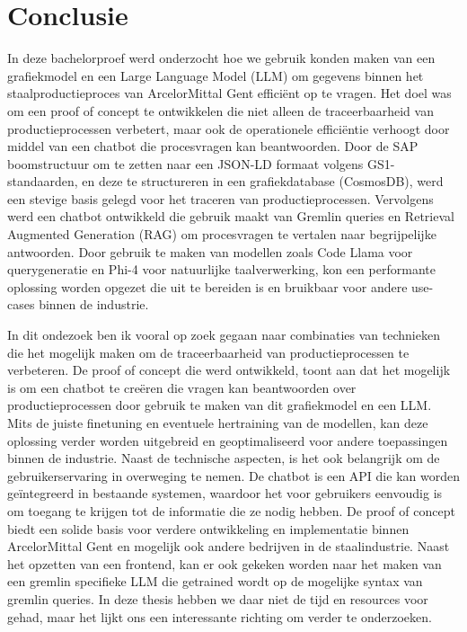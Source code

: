 
\chapter{Conclusie}%
\label{ch:conclusie}
In deze bachelorproef werd onderzocht hoe we gebruik konden maken van een grafiekmodel en een Large Language Model (LLM) om gegevens binnen het staalproductieproces van ArcelorMittal Gent efficiënt op te vragen. 
Het doel was om een proof of concept te ontwikkelen die niet alleen de traceerbaarheid van productieprocessen verbetert, maar ook de operationele efficiëntie verhoogt door middel van een chatbot die procesvragen kan beantwoorden.
Door de SAP boomstructuur om te zetten naar een JSON-LD formaat volgens GS1-standaarden, en deze te structureren in een grafiekdatabase (CosmosDB), werd een stevige basis gelegd voor het traceren van productieprocessen.
Vervolgens werd een chatbot ontwikkeld die gebruik maakt van Gremlin queries en Retrieval Augmented Generation (RAG) om procesvragen te vertalen naar begrijpelijke antwoorden.
Door gebruik te maken van modellen zoals Code Llama voor querygeneratie en Phi-4 voor natuurlijke taalverwerking, kon een performante oplossing worden opgezet die uit te bereiden is en bruikbaar voor andere use-cases binnen de industrie.

In dit ondezoek ben ik vooral op zoek gegaan naar combinaties van technieken die het mogelijk maken om de traceerbaarheid van productieprocessen te verbeteren.
De proof of concept die werd ontwikkeld, toont aan dat het mogelijk is om een chatbot te creëren die vragen kan beantwoorden over productieprocessen door gebruik te maken van dit grafiekmodel en een LLM.
Mits de juiste finetuning en eventuele hertraining van de modellen, kan deze oplossing verder worden uitgebreid en geoptimaliseerd voor andere toepassingen binnen de industrie.
Naast de technische aspecten, is het ook belangrijk om de gebruikerservaring in overweging te nemen.
De chatbot is een API die kan worden geïntegreerd in bestaande systemen, waardoor het voor gebruikers eenvoudig is om toegang te krijgen tot de informatie die ze nodig hebben.
De proof of concept biedt een solide basis voor verdere ontwikkeling en implementatie binnen ArcelorMittal Gent en mogelijk ook andere bedrijven in de staalindustrie.
Naast het opzetten van een frontend, kan er ook gekeken worden naar het maken van een gremlin specifieke LLM die getrained wordt op de mogelijke syntax van gremlin queries.
In deze thesis hebben we daar niet de tijd en resources voor gehad, maar het lijkt ons een interessante richting om verder te onderzoeken.




